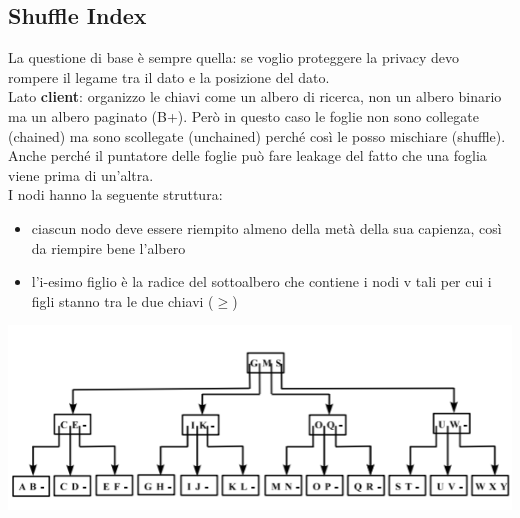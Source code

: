 \subsection{Shuffle Index}
La questione di base è sempre quella: se voglio proteggere la privacy devo rompere il legame tra il dato e la posizione del dato.\\
Lato \textbf{client}: organizzo le chiavi come un albero di ricerca, non un albero binario ma un albero paginato (B+). Però in questo caso le foglie non sono collegate (chained) ma sono scollegate (unchained) perché così le posso mischiare (shuffle). Anche perché il puntatore delle foglie può fare leakage del fatto che una foglia viene prima di un’altra.\\
I nodi hanno la seguente struttura:
\begin{itemize}
    \item ciascun nodo deve essere riempito almeno della metà della sua capienza, così da riempire bene l’albero
    \item l’i-esimo figlio è la radice del sottoalbero che contiene i nodi v tali per cui i figli stanno tra le due chiavi (\(\geq\))
\end{itemize}
\begin{center}
    \includegraphics[scale=0.8]{img/shuffle.png}
\end{center}
